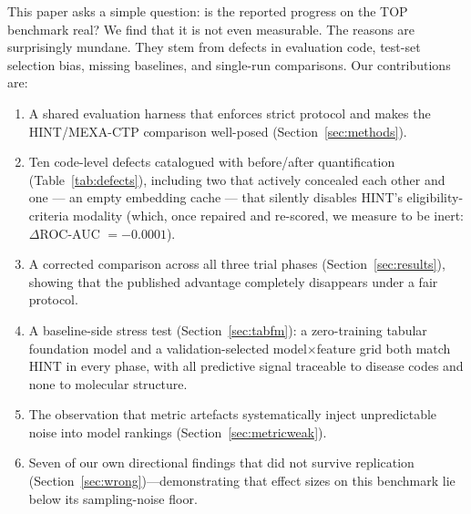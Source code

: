 \documentclass[a4paper,fleqn]{cas-sc}
\begin{document}
This paper asks a simple question: is the reported progress on the TOP benchmark real? We find that it is not even measurable. The reasons are surprisingly mundane. They stem from defects in evaluation code, test-set selection bias, missing baselines, and single-run comparisons. Our contributions are:
\begin{enumerate}
  \item A shared evaluation harness that enforces strict protocol and makes the HINT/MEXA-CTP comparison well-posed (Section~\ref{sec:methods}).
  \item Ten code-level defects catalogued with before/after quantification (Table~\ref{tab:defects}), including two that actively concealed each other and one --- an empty embedding cache --- that silently disables HINT's eligibility-criteria modality (which, once repaired and re-scored, we measure to be inert: $\Delta$ROC-AUC $=-0.0001$).
  \item A corrected comparison across all three trial phases (Section~\ref{sec:results}), showing that the published advantage completely disappears under a fair protocol.
  \item A baseline-side stress test (Section~\ref{sec:tabfm}): a zero-training tabular foundation model and a validation-selected model$\times$feature grid both match HINT in every phase, with all predictive signal traceable to disease codes and none to molecular structure.
  \item The observation that metric artefacts systematically inject unpredictable noise into model rankings (Section~\ref{sec:metricweak}).
  \item Seven of our own directional findings that did not survive replication (Section~\ref{sec:wrong})---demonstrating that effect sizes on this benchmark lie below its sampling-noise floor.
\end{enumerate}
\end{document}
